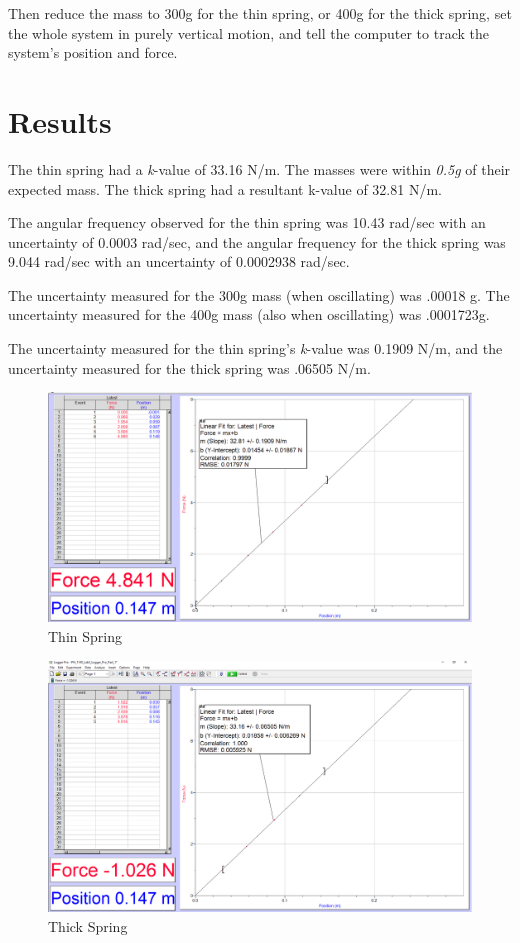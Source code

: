 \documentclass[]{article}
\begin{document}
Then reduce the mass to 300g for the thin spring, or 400g for the thick spring, set the whole system in purely vertical motion, and tell the computer to track the system's position and force.


\section{Results}

The thin spring had a \textit{k}-value of 33.16 N/m. The masses were within \textit{0.5g} of their expected mass. The thick spring had a resultant k-value of 32.81 N/m. 

The angular frequency observed for the thin spring was 10.43 rad/sec with an uncertainty of 0.0003 rad/sec, and the angular frequency for the thick spring was 9.044 rad/sec with an uncertainty of 0.0002938 rad/sec.

The uncertainty measured for the 300g mass (when oscillating) was .00018 g. The uncertainty measured for the 400g mass (also when oscillating) was .0001723g.

The uncertainty measured for the thin spring's \textit{k}-value was 0.1909 N/m, and the uncertainty measured for the thick spring was .06505 N/m.


\begin{figure}[H]
	\centering
	\includegraphics[width=\textwidth]{res/p1thinSpring}
	\caption{Thin Spring}
	\label{fig:Thin Spring}
\end{figure}

\begin{figure}[H]
	\centering
	\includegraphics[width=\textwidth]{res/p1fatSpring}
	\caption{Thick Spring}
	\label{fig:Thick Spring}
\end{figure}
\end{document}
